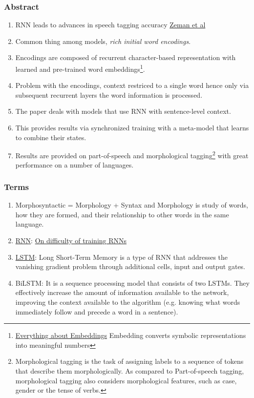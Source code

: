 \documentclass[11pt]{article}
\begin{document}
\subsubsection{Abstract}
\label{sec:orgd64333f}
\begin{enumerate}
\item RNN leads to advances in speech tagging accuracy \href{https://www.aclweb.org/anthology/K18-2001.pdf}{Zeman et al}
\item Common thing among models, \emph{rich initial word encodings}.
\item Encodings are composed of recurrent character-based representation with learned and pre-trained word embeddings\footnote{\href{https://medium.com/@b.terryjack/nlp-everything-about-word-embeddings-9ea21f51ccfe}{Everything about Embeddings} Embedding converts symbolic representations into meaningful numbers}.
\item Problem with the encodings, context restriced to a single word hence only via subsequent recurrent layers the word information is processed.
\item The paper deals with models that use RNN with sentence-level context.
\item This provides results via synchronized training with a meta-model that learns to combine their states.
\item Results are provided on part-of-speech and morphological tagging\footnote{Morphological tagging is the task of assigning labels to a sequence of tokens that describe them morphologically. As compared to Part-of-speech tagging, morphological tagging also considers morphological features, such as case, gender or the tense of verbs.} with great performance on a number of languages.
\end{enumerate}
\subsubsection{Terms}
\label{sec:org3afccf1}
\begin{enumerate}
\item Morphosyntactic = Morphology + Syntax and Morphology is study of words, how they are formed, and their relationship to other words in the same language.
\item \href{https://medium.datadriveninvestor.com/how-do-lstm-networks-solve-the-problem-of-vanishing-gradients-a6784971a577}{RNN}: \href{https://arxiv.org/pdf/1211.5063.pdf}{On difficulty of training RNNs}
\item \href{http://colah.github.io/posts/2015-08-Understanding-LSTMs/}{LSTM}: Long Short-Term Memory is a type of RNN that addresses the vanishing gradient problem through additional cells, input and output gates.
\item BiLSTM: It is a sequence processing model that consists of two LSTMs. They effectively increase the amount of information available to the network, improving the context available to the algorithm (e.g. knowing what words immediately follow and precede a word in a sentence).
\end{enumerate}
\end{document}
